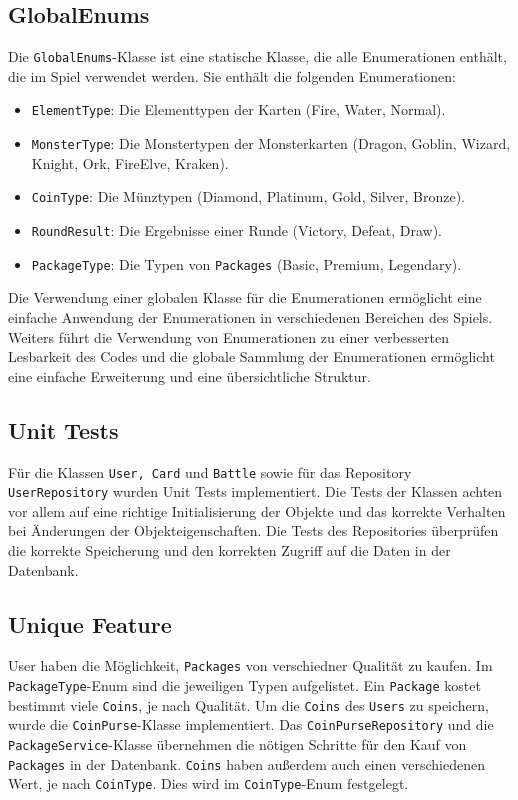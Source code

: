 \documentclass[a4paper, 12pt]{article}
\begin{document}
\subsection{GlobalEnums}
Die \texttt{GlobalEnums}-Klasse ist eine statische Klasse, die alle Enumerationen enthält, die im Spiel verwendet werden. Sie enthält die folgenden Enumerationen:
\begin{itemize}
    \item \texttt{ElementType}: Die Elementtypen der Karten (Fire, Water, Normal).
    \item \texttt{MonsterType}: Die Monstertypen der Monsterkarten (Dragon, Goblin, Wizard, Knight, Ork, FireElve, Kraken).
    \item \texttt{CoinType}: Die Münztypen (Diamond, Platinum, Gold, Silver, Bronze).
    \item \texttt{RoundResult}: Die Ergebnisse einer Runde (Victory, Defeat, Draw).
    \item \texttt{PackageType}: Die Typen von \texttt{Packages} (Basic, Premium, Legendary).
\end{itemize}
Die Verwendung einer globalen Klasse für die Enumerationen ermöglicht eine einfache Anwendung der Enumerationen in verschiedenen Bereichen des Spiels.
Weiters führt die Verwendung von Enumerationen zu einer verbesserten Lesbarkeit des Codes und die globale Sammlung der Enumerationen ermöglicht eine einfache Erweiterung und eine übersichtliche Struktur.

\subsection{Unit Tests}
Für die Klassen \texttt{User, Card} und \texttt{Battle} sowie für das Repository \texttt{UserRepository} wurden Unit Tests implementiert.
Die Tests der Klassen achten vor allem auf eine richtige Initialisierung der Objekte und das korrekte Verhalten bei Änderungen der Objekteigenschaften. 
Die Tests des Repositories überprüfen die korrekte Speicherung und den korrekten Zugriff auf die Daten in der Datenbank.

\subsection{Unique Feature}
User haben die Möglichkeit, \texttt{Packages} von verschiedner Qualität zu kaufen. Im \texttt{PackageType}-Enum sind die jeweiligen Typen aufgelistet. Ein \texttt{Package} kostet bestimmt viele \texttt{Coins}, je nach Qualität.
Um die \texttt{Coins} des \texttt{Users} zu speichern, wurde die \texttt{CoinPurse}-Klasse implementiert. Das \texttt{CoinPurseRepository} und die \texttt{PackageService}-Klasse übernehmen die nötigen Schritte für den Kauf von \texttt{Packages} in der Datenbank.
\texttt{Coins} haben außerdem auch einen verschiedenen Wert, je nach \texttt{CoinType}. Dies wird im \texttt{CoinType}-Enum festgelegt.
\end{document}
